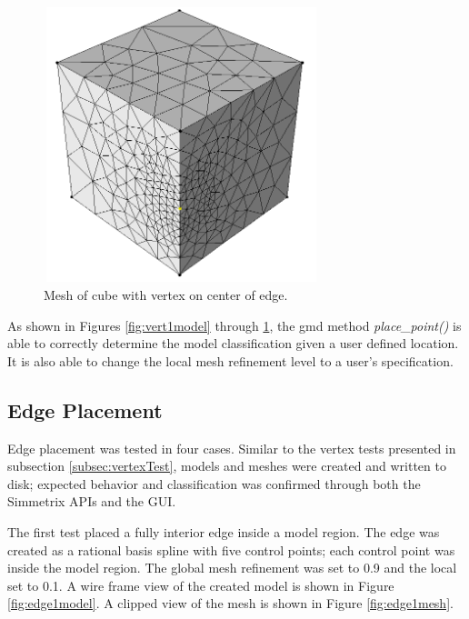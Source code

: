 \documentclass[a4paper, 12pt]{article}
\begin{document}
\begin{figure}[H]
  \centering
  \includegraphics[width=8cm, height=8cm]{test5_sms}
  \caption{Mesh of cube with vertex on center of edge.}
  \label{fig:vert3mesh}
\end{figure}

As shown in Figures \ref{fig:vert1model} through \ref{fig:vert3mesh}, 
the gmd method \emph{place\_point()} is able to correctly determine 
the model classification given a user defined location. It is also 
able to change the local mesh refinement level to a user's specification. 

\subsection{Edge Placement} \label{subsec:edgeTest}
Edge placement was tested in four cases. Similar to the vertex tests 
presented in subsection \ref{subsec:vertexTest}, models and meshes
were created and written to disk; expected behavior and classification
was confirmed through both the Simmetrix APIs and the GUI.

The first test placed a fully interior edge inside a model region. 
The edge was created as a rational basis spline with five control points; 
each control point was inside the model region.
The global mesh refinement was set to 0.9 and the local set to 0.1. 
A wire frame view of the created model is shown in Figure \ref{fig:edge1model}.
A clipped view of the mesh is shown in Figure \ref{fig:edge1mesh}.
\end{document}
